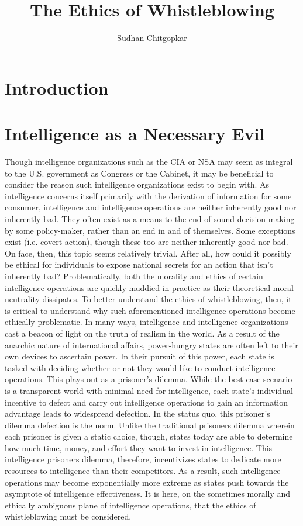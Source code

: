 \documentclass [12 pt] {article}
\title {The Ethics of Whistleblowing}
\author {Sudhan Chitgopkar}
\date {}
\begin{document}
\maketitle
\tableofcontents

\newpage
\section {Introduction}
\section {Intelligence as a Necessary Evil}
Though intelligence organizations such as the CIA or NSA may seem as integral to the U.S. government as Congress or the Cabinet, it may be beneficial to consider the reason such intelligence organizations exist to begin with. As intelligence concerns itself primarily with the derivation of information for some consumer, intelligence and intelligence operations are neither inherently good nor inherently bad. They often exist as a means to the end of sound decision-making by some policy-maker, rather than an end in and of themselves. Some exceptions exist (i.e. covert action), though these too are neither inherently good nor bad. On face, then, this topic seems relatively trivial. After all, how could it possibly be ethical for individuals to expose national secrets for an action that isn't inherently bad? Problematically, both the morality and ethics of certain intelligence operations are quickly muddied in practice as their theoretical moral neutrality dissipates. To better understand the ethics of whistleblowing, then, it is critical to understand why such aforementioned intelligence operations become ethically problematic.
\bigbreak
In many ways, intelligence and intelligence organizations cast a beacon of light on the truth of realism in the world. As a result of the anarchic nature of international affairs, power-hungry states are often left to their own devices to ascertain power. In their pursuit of this power, each state is tasked with deciding whether or not they would like to conduct intelligence operations. This plays out as a prisoner's dilemma. While the best case scenario is a transparent world with minimal need for intelligence, each state's individual incentive to defect and carry out intelligence operations to gain an information advantage leads to widespread defection. In the status quo, this prisoner's dilemma defection is the norm. Unlike the traditional prisoners dilemma wherein each prisoner is given a static choice, though, states today are able to determine how much time, money, and effort they want to invest in intelligence. This intelligence prisoners dilemma, therefore, incentivizes states to dedicate more resources to intelligence than their competitors. As a result, such intelligence operations may become exponentially more extreme as states push towards the asymptote of intelligence effectiveness. It is here, on the sometimes morally and ethically ambiguous plane of intelligence operations, that the ethics of whistleblowing must be considered.
\end{document}
